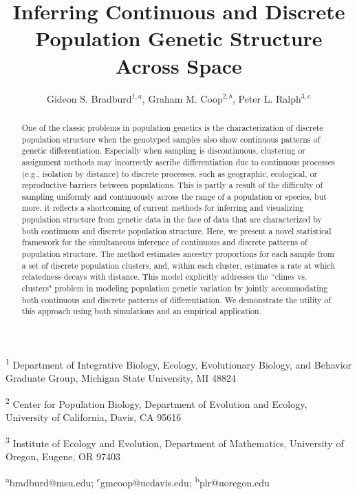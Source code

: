 \documentclass[12pt]{article}
\title{Inferring Continuous and Discrete Population Genetic Structure Across Space}
\date{\vspace{-5ex}}
\author{
Gideon S. Bradburd$^{1,a}$, 
Graham M. Coop$^{2,b}$,
Peter L. Ralph$^{3,c}$}
\begin{document}
\maketitle

\textsuperscript{1}
Department of Integrative Biology, 
Ecology, Evolutionary Biology, and Behavior Graduate Group,
Michigan State University, MI 48824

\textsuperscript{2}
Center for Population Biology,
Department of Evolution and Ecology, 
University of California, Davis, CA 95616

\textsuperscript{3}
Institute of Ecology and Evolution,
Department of Mathematics,
University of Oregon, Eugene, OR 97403

\textsuperscript{a}bradburd@msu.edu; 
\textsuperscript{c}gmcoop@ucdavis.edu;
\textsuperscript{b}plr@uoregon.edu\\\\\

\newpage
 

\begin{abstract}
One of the classic problems in population genetics is the characterization 
of discrete population structure when the genotyped samples also show 
continuous patterns of genetic differentiation.
Especially when sampling is discontinuous, 
clustering or assignment methods may incorrectly ascribe differentiation 
due to continuous processes (e.g., isolation by distance) 
to discrete processes, such as geographic, ecological, or reproductive barriers 
between populations.
This is partly a result of the difficulty of sampling uniformly and continuously 
across the range of a population or species, 
but more, it reflects a shortcoming of current methods for inferring and 
visualizing population structure from genetic data in the face of data 
that are characterized by both continuous and discrete population structure.
Here, we present a novel statistical framework for the simultaneous inference 
of continuous and discrete patterns of population structure.
The method estimates ancestry proportions for each 
sample from a set of discrete population clusters, 
and, within each cluster, estimates a rate at which relatedness decays with distance.
This model explicitly addresses the ``clines vs. clusters" problem in 
modeling population genetic variation by jointly accommodating both 
continuous and discrete patterns of differentiation. 
We demonstrate the utility of this approach using both simulations and an empirical application.
\end{abstract}
\end{document}
